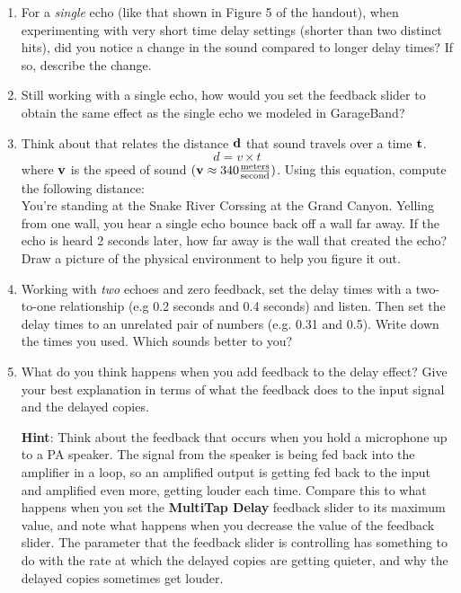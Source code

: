 \documentclass[11pt]{article}
\begin{document}
\begin{enumerate}

\item For a \emph{single} echo (like that shown in Figure 5 of the handout), when experimenting with very short time delay settings (shorter than two distinct hits), did you notice a change in the sound compared to longer delay times?  If so, describe the change.

\vspace{40mm}

\item Still working with a single echo, how would you set the feedback slider to obtain the same effect as the single echo we modeled in GarageBand?

\vspace{30mm}

\item Think about that relates the distance ${\bf d}$ that sound travels over a time ${\bf t}$.  \[d = v\times t\] where ${\bf v}$ is the speed of sound \(({\bf v} \approx 340 \frac{\text{meters}}{\text{second}})\).  Using this equation, compute the following distance: \\

You're standing at the Snake River Corssing at the Grand Canyon.  Yelling from one wall, you hear a single echo bounce back off a wall far away.  If the echo is heard 2 seconds later, how far away is the wall that created the echo?  Draw a picture of the physical environment to help you figure it out.  

\newpage

\vspace{50mm}

\item Working with \emph{two} echoes and zero feedback, set the delay times with a two-to-one relationship (e.g 0.2 seconds and 0.4 seconds) and listen.  Then set the delay times to an unrelated pair of numbers (e.g. 0.31 and 0.5).  Write down the times you used.  Which sounds better to you?

\vspace{50mm}

\item What do you think happens when you add feedback to the delay effect?  Give your best explanation in terms of what the feedback does to the input signal and the delayed copies.  \\ 

\vspace{1mm}

{\bf Hint}:  Think about the feedback that occurs when you hold a microphone up to a PA speaker.  The signal from the speaker is being fed back into the amplifier in a loop, so an amplified output is getting fed back to the input and amplified even more, getting louder each time.  Compare this to what happens when you set the {\bf MultiTap Delay} feedback slider to its maximum value, and note what happens when you decrease the value of the feedback slider.  The parameter that the feedback slider is controlling has something to do with the rate at which the delayed copies are getting quieter, and why the delayed copies sometimes get louder.

\end{enumerate}
\end{document}

